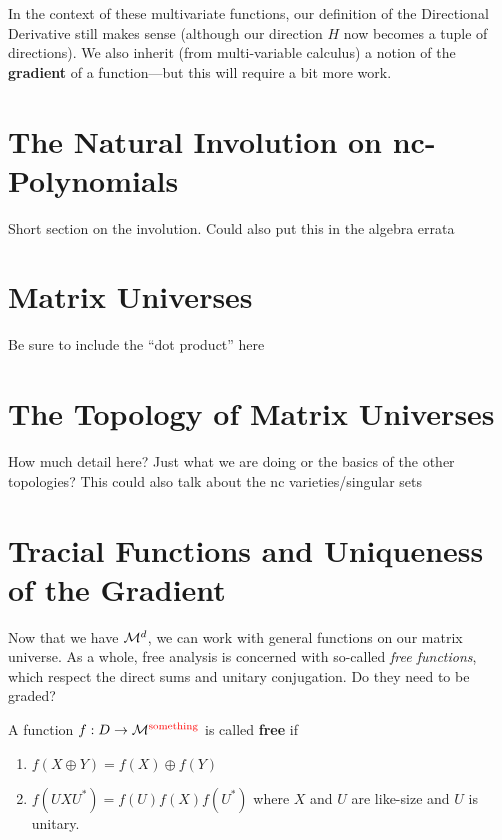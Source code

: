 In the context of these multivariate functions, our definition of the
Directional Derivative still makes sense (although our direction \(H\) now
becomes a tuple of directions). We also inherit (from multi-variable calculus) a
notion of the \textbf{gradient} of a function---but this will require a bit more work.


\section{The Natural Involution on nc-Polynomials}%
\label{sec:NatInvo}

{\color{blue} Short section on the involution. Could also put this in the
  algebra errata}

\section{Matrix Universes}%
\label{sec:MatUniv}

{\color{blue} Be sure to include the ``dot product'' here}

\section{The Topology of Matrix Universes }%
\label{sec:TopManUniv}

{\color{blue} How much detail here? Just what we are doing or the basics of the
  other topologies? This could also talk about the nc varieties/singular sets}



\section{Tracial Functions and Uniqueness of the Gradient}%
\label{sec:TracGrad}
Now that we have \(\mathcal{M}^d\), we can work with general functions on our matrix
universe. As a whole, free analysis is concerned with so-called \emph{free
  functions}, which respect the direct sums and unitary conjugation.
{\color{red} Do they need to be graded?}
\begin{definition}
\label{def:FreeFun}
  A function \(f: D\to \mathcal{M}^{\color{red} \text{something}}\) is called \textbf{free} if
  \begin{enumerate}
    \item \(f(X\oplus Y)= f(X) \oplus f(Y)\)
    \item \(f(U X U^*) = f(U)f(X)f(U^*)\) where \(X\) and \(U\) are like-size
          and \(U\) is unitary.
  \end{enumerate}
\end{definition}

